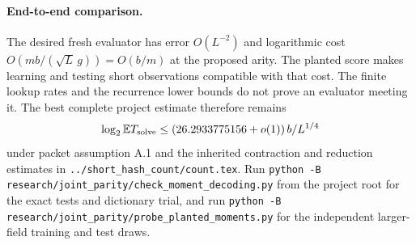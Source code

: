 \documentclass[11pt]{article}
\newcommand{\E}{\mathbb E}
\begin{document}
\paragraph{End-to-end comparison.}
The desired fresh evaluator has error $O(L^{-2})$ and logarithmic
cost $O(mb/(\sqrt L\,g))=O(b/m)$ at the proposed arity.
The planted score makes learning and testing short observations compatible
with that cost. The finite lookup rates and the recurrence lower bounds
do not prove an evaluator meeting it. The best complete project estimate
therefore remains
\[
 \log_2\E T_{\rm solve}\le
 (26.2933775156+o(1))\,b/L^{1/4}
\]
under packet assumption A.1 and the inherited contraction and reduction
estimates in \texttt{../short\_hash\_count/count.tex}.
Run \texttt{python -B research/joint\_parity/check\_moment\_decoding.py}
from the project root for the exact tests and dictionary trial, and run
\texttt{python -B research/joint\_parity/probe\_planted\_moments.py}
for the independent larger-field training and test draws.
\end{document}
